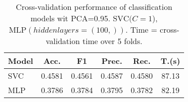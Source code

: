 \begin{table}
    \centering
    \caption{Cross-validation performance of classification models wit PCA=0.95.
     $ \text{SVC}(C=1$), $ \text{MLP}(hidden layers =(100,))$.  
     Time = cross-validation time over 5 folds.}
    \label{tab:CIFAR_cross_validation}
    \begin{tabular}{|l|c|c|c|c|c|}
    \toprule
    Model & Acc. & F1 & Prec. & Rec. & T.(s) \\
    \midrule
    SVC & 0.4581 & 0.4561 & 0.4587 & 0.4580 & 87.13 \\
    MLP & 0.3786 & 0.3784 & 0.3795 & 0.3782 & 82.19 \\
    \bottomrule
    \end{tabular}
\end{table}